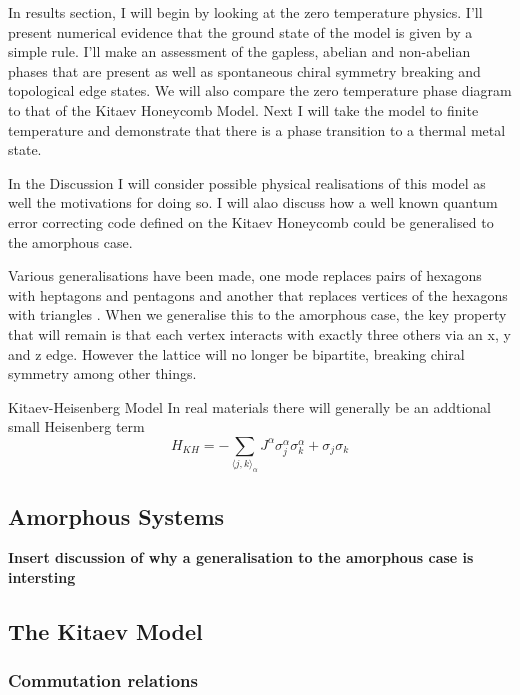 In results section, I will begin by looking at the zero temperature
physics. I'll present numerical evidence that the ground state of the
model is given by a simple rule. I'll make an assessment of the gapless,
abelian and non-abelian phases that are present as well as spontaneous
chiral symmetry breaking and topological edge states. We will also
compare the zero temperature phase diagram to that of the Kitaev
Honeycomb Model. Next I will take the model to finite temperature and
demonstrate that there is a phase transition to a thermal metal state.

In the Discussion I will consider possible physical realisations of this
model as well the motivations for doing so. I will alao discuss how a
well known quantum error correcting code defined on the Kitaev Honeycomb
could be generalised to the amorphous case.

Various generalisations have been made, one mode replaces pairs of
hexagons with heptagons and pentagons
\cite{periNonAbelianChiralSpin2020} and another that replaces vertices
of the hexagons with triangles \cite{yaoExactChiralSpin2007}. When we
generalise this to the amorphous case, the key property that will remain
is that each vertex interacts with exactly three others via an x, y and
z edge. However the lattice will no longer be bipartite, breaking chiral
symmetry among other things.

Kitaev-Heisenberg Model In real materials there will generally be an
addtional small Heisenberg term
\[H_{KH} =  - \sum_{\langle j,k\rangle_\alpha} J^{\alpha}\sigma_j^{\alpha}\sigma_k^{\alpha} + \sigma_j\sigma_k\]

\hypertarget{amorphous-systems}{%
\subsection{Amorphous Systems}\label{amorphous-systems}}

\textbf{Insert discussion of why a generalisation to the amorphous case
is intersting}

\hypertarget{the-kitaev-model}{%
\subsection{The Kitaev Model}\label{the-kitaev-model}}

\hypertarget{commutation-relations}{%
\subsubsection{Commutation relations}\label{commutation-relations}}

